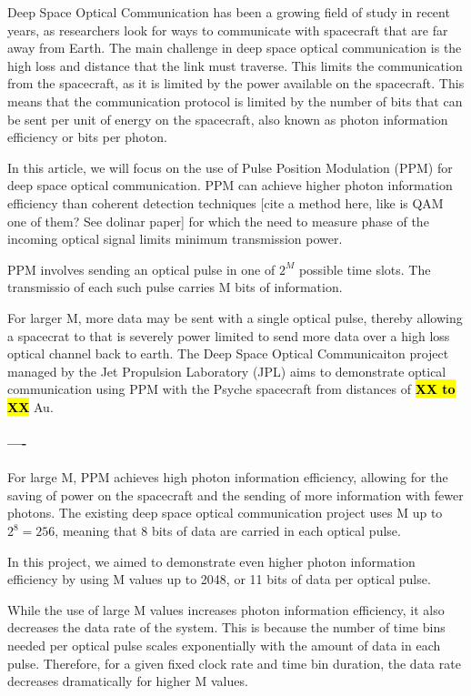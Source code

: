 \documentclass{optica-article}
\begin{document}
Deep Space Optical Communication has been a growing field of study in recent years, as researchers look for ways to communicate with spacecraft that are far away from Earth. The main challenge in deep space optical communication is the high loss and distance that the link must traverse. This limits the communication from the spacecraft, as it is limited by the power available on the spacecraft. This means that the communication protocol is limited by the number of bits that can be sent per unit of energy on the spacecraft, also known as photon information efficiency or bits per photon.

In this article, we will focus on the use of Pulse Position Modulation (PPM) for deep space optical communication. PPM can achieve higher photon information efficiency than coherent detection techniques {[}cite a method here, like is QAM one of them? See dolinar paper{]} for which the need to measure phase of the incoming optical signal limits minimum transmission power.

PPM involves sending an optical pulse in one of $2^M$ possible time slots. The transmissio of each such pulse carries M bits of information.

For larger M, more data may be sent with a single optical pulse, thereby allowing a spacecrat to that is severely power limited to send more data over a high loss optical channel back to earth. The Deep Space Optical Communicaiton project managed by the Jet Propulsion Laboratory (JPL) aims to demonstrate optical communication using PPM with the Psyche spacecraft from distances of \textbf{\hl{XX to XX}} Au.

\hypertarget{section}{%
\paragraph{----}\label{section}}

For large M, PPM achieves high photon information efficiency, allowing for the saving of power on the spacecraft and the sending of more information with fewer photons. The existing deep space optical communication project uses M up to $2^8 = 256$, meaning that 8 bits of data are carried in each optical pulse.

In this project, we aimed to demonstrate even higher photon information efficiency by using M values up to 2048, or 11 bits of data per optical pulse.

While the use of large M values increases photon information efficiency, it also decreases the data rate of the system. This is because the number of time bins needed per optical pulse scales exponentially with the amount of data in each pulse. Therefore, for a given fixed clock rate and time bin duration, the data rate decreases dramatically for higher M values.
\end{document}
